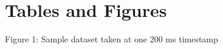 \documentclass[12pt,letterpaper]{article}
\begin{document}
%

\section{Tables and Figures}
\begin{center} Figure 1: Sample dataset taken at one 200 ms timestamp \end{center}


\end{document}

